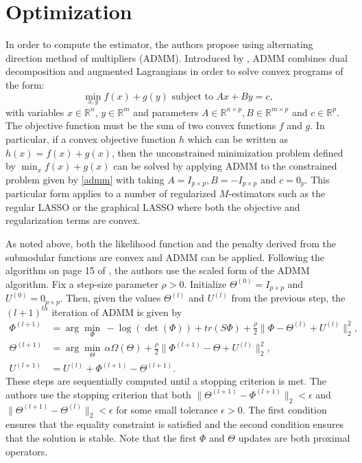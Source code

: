 \documentclass{uwstat572}
\theoremstyle{remark}
\theoremstyle{definition}
\begin{document}
\section{Optimization}

In order to compute the estimator, the authors propose using alternating direction method of multipliers (ADMM).  Introduced by \cite{Boyd2011}, ADMM combines dual decomposition and augmented Lagrangians in order to solve convex programs of the form:
\begin{equation}\label{admm}
    \min_{x,y} f(x) + g(y) {\text{  subject to }} Ax + By = c,
\end{equation}
with variables $x \in \mathbb{R}^n, \, y \in \mathbb{R}^m$ and parameters $A \in \mathbb{R}^{n \times p}, B \in \mathbb{R}^{m \times p}$ and $c \in \mathbb{R}^p$.  The objective function must be the sum of two convex functions $f$ and $g$.  In particular, if a convex objective function $h$ which can be written as $h(x) = f(x) + g(x)$, then the unconstrained minimization problem defined by $\min_{x} f(x) + g(x)$ can be solved by applying ADMM to the constrained problem given by
\ref{admm} with taking $A = I_{p \times p}, B = - I_{p \times p}$ and $c = 0_p$.
This particular form applies to a number of regularized $M$-estimators such as the regular LASSO or the graphical LASSO where both the objective and regularization terms are convex.  

As noted above, both the likelihood function and the penalty derived from the submodular functions are convex and ADMM can be applied. Following the algorithm on page 15 of \citep{Boyd2011}, the authors use the scaled form of the ADMM algorithm.  Fix a step-size parameter $\rho > 0$.  Initialize $\Theta^{(0)} = I_{p\times p}$ and $U^{(0)} = 0_{p \times p}$.  Then, given the values $\Theta^{(l)}$ and $U^{(l)}$ from the previous step, the $(l+1)^{th}$ iteration of ADMM is given by
\begin{align}
\Phi^{(l+1)} & =  \arg\min_{\Phi} \, -\log(\det(\Phi)) + tr(S \Phi) + \frac{\rho}{2}\| \Phi - \Theta^{(l)} + U^{(l)}\|_2^2,
\label{likprox}
\\
\Theta^{(l+1)} & = \arg \min_{\Theta} \, \alpha \Omega(\Theta) + \frac{\rho}{2} \| \Phi^{(l+1)} - \Theta + U^{(l)} \|_2^2,
\label{omegaprox}
\\
U^{(l+1)} & = U^{(l)} + \Phi^{(l+1)} - \Theta^{(l+1)}.
\label{resid}
\end{align}
These steps are sequentially computed until a stopping criterion is met.  The authors use the stopping criterion that both $\|\Theta^{(l+1)} - \Phi^{(l+1)}\|_2 < \epsilon$ and $\|\Theta^{(l+1)} - \Theta^{(l)}\|_2 < \epsilon$ for some small tolerance $\epsilon > 0$.  The first condition ensures that the equality constraint is satisfied and the second condition ensures that the solution is stable.  Note that the first $\Phi$ and $\Theta$ updates are both proximal operators. 
\end{document}
